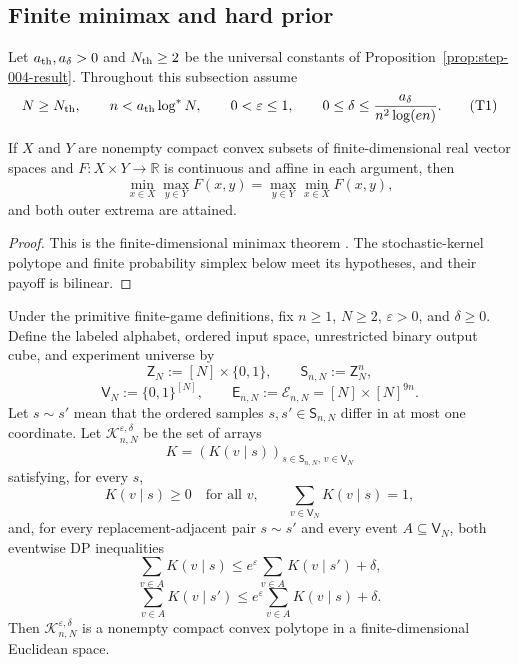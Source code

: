 \subsection{Finite minimax and hard prior}
\label{app:step-005}

Let $a_{\rm th},a_\delta>0$ and $N_{\rm th}\geq2$ be the universal
constants of Proposition~\ref{prop:step-004-result}.  Throughout this
subsection assume
\[
N\geq N_{\rm th},\qquad
n<a_{\rm th}\log^*N,
\qquad 0<\varepsilon\leq1,\qquad
0\leq\delta\leq\frac{a_\delta}{n^2\log(en)}.
\tag{T1}\label{eq:step-005-t1}
\]

\begin{theorem}
\label{thm:finite-minimax}
If $X$ and $Y$ are nonempty compact convex subsets of finite-dimensional
real vector spaces and $F:X\times Y\to\mathbb R$ is continuous and affine
in each argument, then
\[
\min_{x\in X}\max_{y\in Y}F(x,y)
=\max_{y\in Y}\min_{x\in X}F(x,y),
\tag{C2}\label{eq:step-005-c2}
\]
and both outer extrema are attained.
\end{theorem}
\begin{proof}
This is the finite-dimensional minimax theorem
\citep{vonNeumann1928}.  The stochastic-kernel polytope and finite
probability simplex below meet its hypotheses, and their payoff is
bilinear.
\end{proof}



\begin{proposition}
\label{prop:step-005-dp-polytope}

Under the primitive finite-game definitions, fix \(n\ge 1\), \(N\ge 2\), \(\varepsilon>0\), and \(\delta\ge 0\). Define the labeled alphabet, ordered input space, unrestricted binary output cube, and experiment universe by
\[
\mathsf Z_N:=[N]\times\{0,1\},
\qquad
\mathsf S_{n,N}:=\mathsf Z_N^n,
\tag{1}\label{eq:step-005-1}
\]
\[
\mathsf V_N:=\{0,1\}^{[N]},
\qquad
\mathsf E_{n,N}:=\mathcal E_{n,N}=[N]\times[N]^{9n}.
\tag{2}\label{eq:step-005-2}
\]
Let \(s \sim s'\) mean that the ordered samples \(s,s' \in \mathsf S_{n,N}\) differ in at most one coordinate. Let
\(\mathcal K_{n,N}^{\varepsilon,\delta}\) be the set of arrays
\[
K=(K(v\mid s))_{s\in\mathsf S_{n,N},\,v\in\mathsf V_N}
\tag{3}\label{eq:step-005-3}
\]
satisfying, for every \(s\),
\[
K(v\mid s)\ge0
\quad\text{for all }v,
\qquad
\sum_{v\in\mathsf V_N}K(v\mid s)=1,
\tag{4}\label{eq:step-005-4}
\]
and, for every replacement-adjacent pair \(s \sim s'\) and every event
\(A\subseteq\mathsf V_N\), both eventwise DP inequalities
\[
\sum_{v\in A}K(v\mid s)
\le
e^\varepsilon\sum_{v\in A}K(v\mid s')+\delta,
\tag{5a}\label{eq:step-005-5a}
\]
\[
\sum_{v\in A}K(v\mid s')
\le
e^\varepsilon\sum_{v\in A}K(v\mid s)+\delta.
\tag{5b}\label{eq:step-005-5b}
\]
Then \(\mathcal K_{n,N}^{\varepsilon,\delta}\) is a nonempty compact convex polytope in a finite-dimensional Euclidean space.

\end{proposition}

